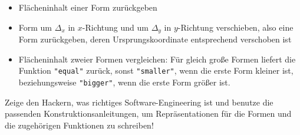 \begin{aufgabe}
\begin{itemize}
\begin{itemize}
    \item Flächeninhalt einer Form zurückgeben

    \item Form um $\Delta_x$ in $x$-Richtung und um $\Delta_y$ in
      $y$-Richtung verschieben, also eine Form zurückgeben, deren
      Ursprungskoordinate entsprechend verschoben ist

  \item  Flächeninhalt zweier
    Formen vergleichen: Für gleich große Formen liefert die Funktion
    \verb|"equal"| zurück, sonst \verb|"smaller"|, wenn die erste
    Form kleiner ist, beziehungsweise \verb|"bigger"|, wenn die erste
    Form größer ist.
    \end{itemize}

  \end{itemize}

  Zeige den Hackern, was richtiges Software-Engineering ist und
  benutze die passenden Konstruktionsanleitungen, um Repräsentationen für die Formen und die zugehörigen
  Funktionen zu schreiben!
\end{aufgabe}

